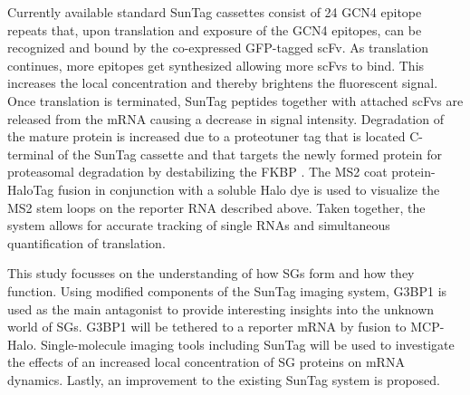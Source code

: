 Currently available standard SunTag cassettes consist of 24 GCN4 epitope repeats that, upon translation and exposure of the GCN4 epitopes, can be recognized and bound by the co-expressed GFP-tagged scFv.
As translation continues, more epitopes get synthesized allowing more scFvs to bind.
This increases the local concentration and thereby brightens the fluorescent signal.
Once translation is terminated, SunTag peptides together with attached scFvs are released from the mRNA causing a decrease in signal intensity.
Degradation of the mature protein is increased due to a proteotuner tag that is located C-terminal of the SunTag cassette and that targets the newly formed protein for proteasomal degradation by destabilizing the FKBP \cite{azevedo_systematic_2012}.
The MS2 coat protein-HaloTag fusion in conjunction with a soluble Halo dye is used to visualize the MS2 stem loops on the reporter RNA described above.
Taken together, the system allows for accurate tracking of single RNAs and simultaneous quantification of translation.

This study focusses on the understanding of how SGs form and how they function.
Using modified components of the SunTag imaging system, G3BP1 is used as the main antagonist to provide interesting insights into the unknown world of SGs.
G3BP1 will be tethered to a reporter mRNA by fusion to MCP-Halo.
Single-molecule imaging tools including SunTag will be used to investigate the effects of an increased local concentration of SG proteins on mRNA dynamics.
Lastly, an improvement to the existing SunTag system is proposed.
